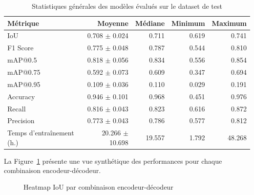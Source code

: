 \begin{table}[H]
    \centering
    \begin{tabular}{@{}lrrrr@{}}
    \toprule
    \textbf{Métrique} & \textbf{Moyenne} & \textbf{Médiane} & \textbf{Minimum} & \textbf{Maximum} \\
    \midrule
    IoU & 0.708 $\pm$ 0.024 & 0.711 & 0.619 & 0.741 \\
    F1 Score & 0.775 $\pm$ 0.048 & 0.787 & 0.544 & 0.810 \\
    mAP@0.5 & 0.818 $\pm$ 0.056 & 0.834 & 0.556 & 0.854 \\
    mAP@0.75 & 0.592 $\pm$ 0.073 & 0.609 & 0.347 & 0.694 \\
    mAP@0.95 & 0.109 $\pm$ 0.036 & 0.110 & 0.029 & 0.191 \\
    Accuracy & 0.946 $\pm$ 0.101 & 0.968 & 0.451 & 0.976 \\
    Recall & 0.816 $\pm$ 0.043 & 0.823 & 0.616 & 0.872 \\
    Precision & 0.773 $\pm$ 0.043 & 0.786 & 0.577 & 0.812 \\
    Temps d'entraînement (h.) & 20.266 $\pm$ 10.698 & 19.557 & 1.792 & 48.268 \\
    \bottomrule
    \end{tabular}
    \caption{Statistiques générales des modèles évalués sur le dataset de test}
    \label{tab:vue_ensemble_metrique_moyennes}
\end{table}

La Figure~\ref{fig:heatmap_iou} présente une vue synthétique des performances pour chaque combinaison encodeur-décodeur.

\begin{figure}[H]
    \centering
    \caption{Heatmap IoU par combinaison encodeur-décodeur}
    \label{fig:heatmap_iou}
\end{figure}

